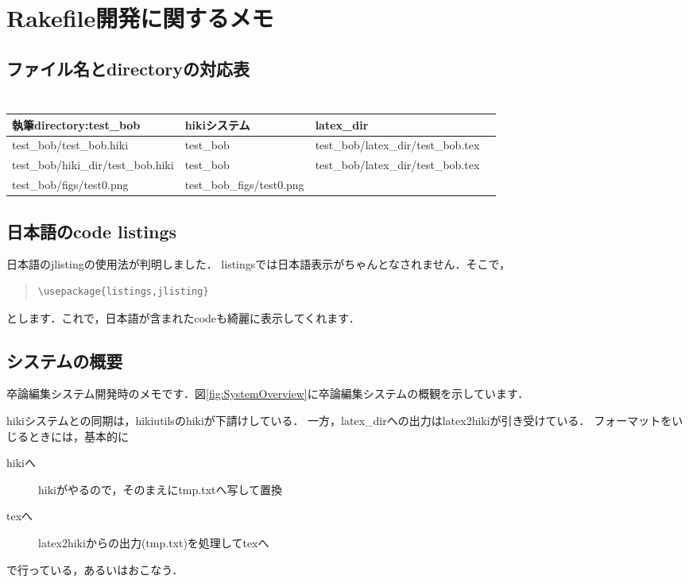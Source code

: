 \section{Rakefile開発に関するメモ}
\subsection{ファイル名とdirectoryの対応表}\begin{quote}\begin{verbatim}

\end{verbatim}\end{quote}
\begin{table}[htbp]\begin{center}
\caption{}
\begin{tabular}{llll}
\hline
執筆directory:test\_bob  &hikiシステム  &latex\_dir  \\ \hline
test\_bob/test\_bob.hiki  &test\_bob  &test\_bob/latex\_dir/test\_bob.tex  \\
test\_bob/hiki\_dir/test\_bob.hiki  &test\_bob  &test\_bob/latex\_dir/test\_bob.tex  \\
test\_bob/figs/test0.png  &test\_bob\_figs/test0.png  \\
\hline
\end{tabular}
\label{default}
\end{center}\end{table}

\subsection{日本語のcode listings}
日本語のjlistingの使用法が判明しました．
listingsでは日本語表示がちゃんとなされません．そこで，
\begin{quote}\begin{verbatim}
\usepackage{listings,jlisting}
\end{verbatim}\end{quote}
とします．これで，日本語が含まれたcodeも綺麗に表示してくれます．

\subsection{システムの概要}
卒論編集システム開発時のメモです．図\ref{fig:SystemOverview}に卒論編集システムの概観を示しています．

hikiシステムとの同期は，hikiutilsのhikiが下請けしている．
一方，latex\_dirへの出力はlatex2hikiが引き受けている．
フォーマットをいじるときには，基本的に
\begin{description}
\item[hikiへ] hikiがやるので，そのまえにtmp.txtへ写して置換

\item[texへ] latex2hikiからの出力(tmp.txt)を処理してtexへ

\end{description}
で行っている，あるいはおこなう．

